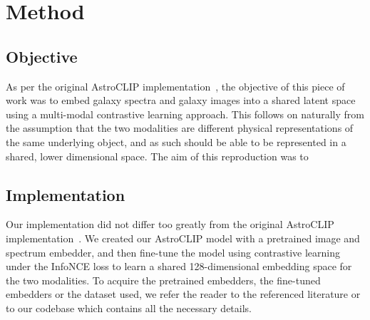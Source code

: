 
\section{Method}\label{sec:method}
\subsection{Objective}\label{subsec:objective}
As per the original AstroCLIP implementation~\citep{astroclip}, the objective of this piece of work was to embed galaxy
spectra and galaxy images into a shared latent space using a multi-modal contrastive learning approach.
This follows on naturally from the assumption that the two modalities are different physical representations of the same
underlying object, and as such should be able to be represented in a shared, lower dimensional space.
The aim of this reproduction was to

\subsection{Implementation}\label{subsec:implementation}
Our implementation did not differ too greatly from the original AstroCLIP implementation~\citep{astroclip}.
We created our AstroCLIP model with a pretrained image and spectrum embedder, and then fine-tune the model using contrastive
learning under the InfoNCE loss to learn a shared 128-dimensional embedding space for the two modalities.
To acquire the pretrained embedders, the fine-tuned embedders or the dataset used, we refer the reader to the referenced
literature or to our codebase which contains all the necessary details.

